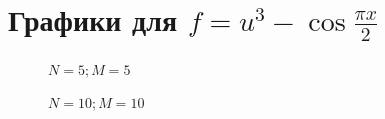 \documentclass[12pt]{extarticle}
\numberwithin{equation}{section}
\begin{document}
\section{Графики для $f=u^3 - \cos \frac{\pi x}{2}$}  \label{grap4}
\begin{figure}[H]
\begin{minipage}[h]{0.43\linewidth}
 $N=5; M=5$ \\
\end{minipage}
\hfill
\begin{minipage}[h]{0.43\linewidth}
 $N=10; M=10$ \\
\end{minipage}
\end{figure}
\end{document}
